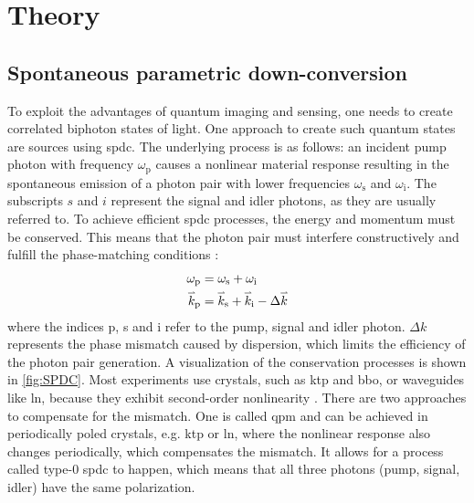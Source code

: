 \section{Theory}
\subsection{Spontaneous parametric down-conversion }
To exploit the advantages of quantum imaging and sensing, one needs to create correlated biphoton states of light. One approach to create such quantum states are sources using \acrfull{spdc}. 
The underlying process is as follows: an incident pump photon with frequency $\omega_{\text{p}}$ causes a nonlinear material response resulting in the spontaneous emission of a photon pair with lower frequencies $\omega_{\text{s}}$ and $\omega_{\text{i}}$. The subscripts $s$ and $i$ represent the signal and idler photons, as they are usually referred to. \newline
To achieve efficient \acrshort{spdc} processes, the energy and momentum must be conserved. This means that the photon pair must interfere constructively and fulfill the phase-matching conditions \cite{gilabertebassetPerspectivesApplicationsQuantum2019} : 
\begin{equation}
	\begin{aligned}
		\omega_{\text{p}} &= \omega_{\text{s}} + \omega_{\text{i}} \\
		\accentset{\rightharpoonup}{k}_{\text{p}} &= \accentset{\rightharpoonup}{k}_{\text{s}} + \accentset{\rightharpoonup}{k}_{\text{i}} - \Delta \accentset{\rightharpoonup}{k}
	\end{aligned}
\end{equation}
where the indices p, s and i refer to the pump, signal and idler photon. $\Delta k$ represents the phase mismatch caused by dispersion, which limits the efficiency of the photon pair generation. A visualization of the conservation processes is shown in \autoref{fig:SPDC}. \newline
Most experiments use crystals, such as \acrfull{ktp} and \acrfull{bbo}, or waveguides like \acrfull{ln}, because they exhibit second-order nonlinearity \cite{fiorentinoSpontaneousParametricDownconversion2007,kwiatUltrabrightSourcePolarizationentangled1999,tanzilliHighlyEfficientPhotonpair2000}.\newline
There are two approaches to compensate for the mismatch.
One is called \acrfull{qpm} and can be achieved in periodically poled crystals, e.g. \acrshort{ktp} or \acrshort{ln}, where the nonlinear response also changes periodically, which compensates the mismatch. It allows for a process called type-0 \acrshort{spdc} to happen, which means that all three photons (pump, signal, idler) have the same polarization. \newline

